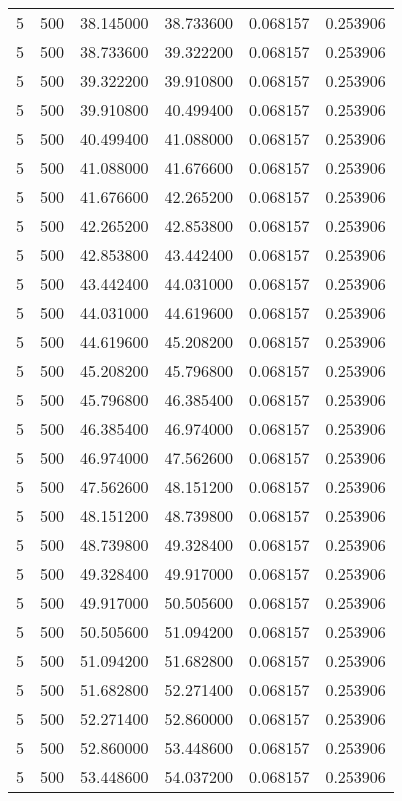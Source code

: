 \begin{longtable}{rrrrrr}
5 & 500 & 38.145000 & 38.733600 & 0.068157 & 0.253906 \\
5 & 500 & 38.733600 & 39.322200 & 0.068157 & 0.253906 \\
5 & 500 & 39.322200 & 39.910800 & 0.068157 & 0.253906 \\
5 & 500 & 39.910800 & 40.499400 & 0.068157 & 0.253906 \\
5 & 500 & 40.499400 & 41.088000 & 0.068157 & 0.253906 \\
5 & 500 & 41.088000 & 41.676600 & 0.068157 & 0.253906 \\
5 & 500 & 41.676600 & 42.265200 & 0.068157 & 0.253906 \\
5 & 500 & 42.265200 & 42.853800 & 0.068157 & 0.253906 \\
5 & 500 & 42.853800 & 43.442400 & 0.068157 & 0.253906 \\
5 & 500 & 43.442400 & 44.031000 & 0.068157 & 0.253906 \\
5 & 500 & 44.031000 & 44.619600 & 0.068157 & 0.253906 \\
5 & 500 & 44.619600 & 45.208200 & 0.068157 & 0.253906 \\
5 & 500 & 45.208200 & 45.796800 & 0.068157 & 0.253906 \\
5 & 500 & 45.796800 & 46.385400 & 0.068157 & 0.253906 \\
5 & 500 & 46.385400 & 46.974000 & 0.068157 & 0.253906 \\
5 & 500 & 46.974000 & 47.562600 & 0.068157 & 0.253906 \\
5 & 500 & 47.562600 & 48.151200 & 0.068157 & 0.253906 \\
5 & 500 & 48.151200 & 48.739800 & 0.068157 & 0.253906 \\
5 & 500 & 48.739800 & 49.328400 & 0.068157 & 0.253906 \\
5 & 500 & 49.328400 & 49.917000 & 0.068157 & 0.253906 \\
5 & 500 & 49.917000 & 50.505600 & 0.068157 & 0.253906 \\
5 & 500 & 50.505600 & 51.094200 & 0.068157 & 0.253906 \\
5 & 500 & 51.094200 & 51.682800 & 0.068157 & 0.253906 \\
5 & 500 & 51.682800 & 52.271400 & 0.068157 & 0.253906 \\
5 & 500 & 52.271400 & 52.860000 & 0.068157 & 0.253906 \\
5 & 500 & 52.860000 & 53.448600 & 0.068157 & 0.253906 \\
5 & 500 & 53.448600 & 54.037200 & 0.068157 & 0.253906 \\

\end{longtable}
